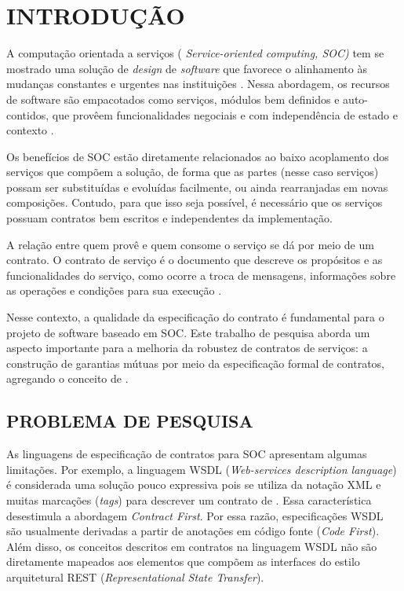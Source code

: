 

\chapter{INTRODUÇÃO}
\vspace{-6mm}

A computação orientada a serviços ( \emph{Service-oriented computing, SOC)} tem
se mostrado uma solução de \textit{design} de \textit{software} que favorece o
alinhamento às mudanças constantes e urgentes nas instituições
\cite{chen2008towards}. Nessa abordagem, os recursos de software são empacotados
como serviços, módulos bem definidos e auto-contidos, que provêem
funcionalidades negociais e com independência de estado e contexto
\cite{papazoglou2007service}.

Os benefícios de SOC estão diretamente relacionados ao
baixo acoplamento dos serviços que compõem a solução, de forma que as partes
(nesse caso serviços) possam ser subs\-ti\-tu\-í\-das e evoluídas facilmente, ou
ainda rearranjadas em novas composições. Contudo, para que isso seja possível, é
necessário que os serviços possuam contratos bem escritos e independentes da
implementação.

A relação entre quem provê e quem consome o serviço se
dá por meio de um contrato. O contrato de serviço é o documento que descreve os
propósitos e as funcionalidades do serviço, como ocorre a troca de mensagens,
informações sobre as operações e condições para sua execução \cite{erl2009web}.

Nesse contexto, a qualidade da especificação do contrato é fundamental para o
projeto de software baseado em SOC. Este trabalho de pesquisa aborda um aspecto
importante para a melhoria da robustez de contratos de serviços: a construção de
garantias mútuas por meio da especificação formal de contratos, agregando o
conceito de \designbycontract{} \cite{meyer1992applying}.

\section{PROBLEMA DE PESQUISA}
\vspace{-6mm}

As linguagens de especificação de contratos para SOC apresentam
algumas limitações. Por exemplo, a linguagem WSDL (\emph{Web-services
description language}) \cite{WSDLSite} é considerada uma solução
pouco expressiva pois se utiliza da notação XML e muitas marcações
(\textit{tags}) para descrever um contrato de \ws{}. Essa característica
desestimula a abordagem \textit{Contract First}.
Por essa razão, especificações WSDL são usualmente derivadas a partir de anotações em código
fonte (\textit{Code First}).
Além disso, os conceitos descritos em contratos na linguagem WSDL não são
diretamente mapeados aos elementos que compõem as interfaces do estilo
arquitetural REST\cite{fielding2000architectural} (\emph{Representational State Transfer}).

